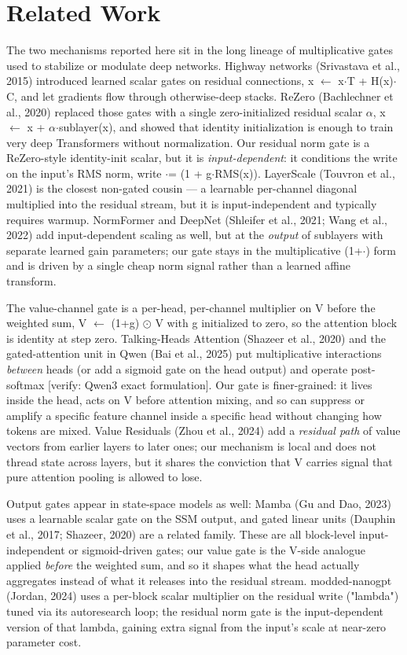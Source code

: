 \documentclass[11pt,a4paper]{article}
\begin{document}
\section{Related Work}
The two mechanisms reported here sit in the long lineage of multiplicative gates used to stabilize or modulate deep networks. Highway networks (Srivastava et al., 2015) introduced learned scalar gates on residual connections, x $\leftarrow$ x$\cdot$T + H(x)$\cdot$C, and let gradients flow through otherwise-deep stacks. ReZero (Bachlechner et al., 2020) replaced those gates with a single zero-initialized residual scalar $\alpha$, x $\leftarrow$ x + $\alpha$$\cdot$sublayer(x), and showed that identity initialization is enough to train very deep Transformers without normalization. Our residual norm gate is a ReZero-style identity-init scalar, but it is \emph{input-dependent}: it conditions the write on the input's RMS norm, write $\cdot$= (1 + g$\cdot$RMS(x)). LayerScale (Touvron et al., 2021) is the closest non-gated cousin --- a learnable per-channel diagonal multiplied into the residual stream, but it is input-independent and typically requires warmup. NormFormer and DeepNet (Shleifer et al., 2021; Wang et al., 2022) add input-dependent scaling as well, but at the \emph{output} of sublayers with separate learned gain parameters; our gate stays in the multiplicative (1+$\cdot$) form and is driven by a single cheap norm signal rather than a learned affine transform.

The value-channel gate is a per-head, per-channel multiplier on V before the weighted sum, V $\leftarrow$ (1+g) $\odot$ V with g initialized to zero, so the attention block is identity at step zero. Talking-Heads Attention (Shazeer et al., 2020) and the gated-attention unit in Qwen (Bai et al., 2025) put multiplicative interactions \emph{between} heads (or add a sigmoid gate on the head output) and operate post-softmax [verify: Qwen3 exact formulation]. Our gate is finer-grained: it lives inside the head, acts on V before attention mixing, and so can suppress or amplify a specific feature channel inside a specific head without changing how tokens are mixed. Value Residuals (Zhou et al., 2024) add a \emph{residual path} of value vectors from earlier layers to later ones; our mechanism is local and does not thread state across layers, but it shares the conviction that V carries signal that pure attention pooling is allowed to lose.

Output gates appear in state-space models as well: Mamba (Gu and Dao, 2023) uses a learnable scalar gate on the SSM output, and gated linear units (Dauphin et al., 2017; Shazeer, 2020) are a related family. These are all block-level input-independent or sigmoid-driven gates; our value gate is the V-side analogue applied \emph{before} the weighted sum, and so it shapes what the head actually aggregates instead of what it releases into the residual stream. modded-nanogpt (Jordan, 2024) uses a per-block scalar multiplier on the residual write ("lambda") tuned via its autoresearch loop; the residual norm gate is the input-dependent version of that lambda, gaining extra signal from the input's scale at near-zero parameter cost.
\end{document}

